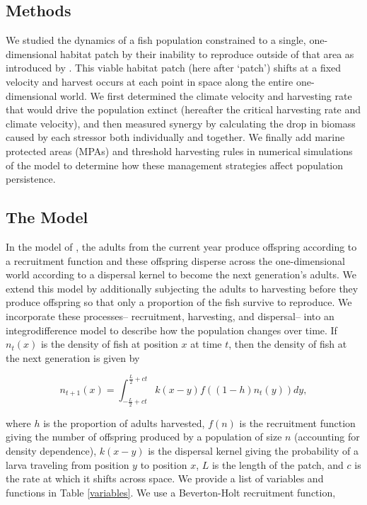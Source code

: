 \documentclass[12pt,english]{article}
\begin{document}
\begin{spacing}{1.9}
\begin{flushleft}
\section{Methods}

We studied the dynamics of a fish population constrained to a single, one-dimensional habitat patch by their inability to reproduce outside of that area as introduced by \cite{ZhouKot2011}. This viable habitat patch (here after `patch') shifts at a fixed velocity and harvest occurs at each point in space along the entire one-dimensional world.  We first determined the climate velocity and harvesting rate that would drive the population extinct (hereafter the critical harvesting rate and climate velocity), and then measured synergy by calculating the drop in biomass caused by each stressor both individually and together. We finally add marine protected areas (MPAs) and threshold harvesting rules in numerical simulations of the model to determine how these management strategies affect population persistence.

\subsection{The Model }

In the model of \cite{ZhouKot2011}, the adults from the current year produce offspring according to a recruitment function and these offspring disperse across the one-dimensional world according to a dispersal kernel to become the next generation's adults.  We extend this model by additionally subjecting the adults to harvesting before they produce offspring so that only a proportion of the fish survive to reproduce. We incorporate these processes-- recruitment, harvesting, and dispersal-- into an integrodifference model to describe how the population changes over time. If $n_t(x)$ 
is the density of fish at position $x$ at time $t$, then the density of fish at the next generation is given by

\begin{equation*}
n_{t+1}(x)=\int^{\frac{L}{2}+ct}_{-\frac{L}{2}+ct}k(x-y)f((1-h)n_t(y))dy \label{integrodifference},
\end{equation*}

\noindent where $h$ is the proportion of adults harvested, $f(n)$ is the recruitment function giving the number of 
offspring produced by a population of size $n$ (accounting for density dependence), $k(x-y)$ is the dispersal kernel giving the probability of a  larva traveling from position $y$ to position $x$, $L$ is the length of the patch, and $c$ is the rate at which it  shifts across space.  We provide a list of variables and functions in Table \ref{variables}.  We use a Beverton-Holt recruitment function,


\end{flushleft}
\end{spacing}
\end{document}
